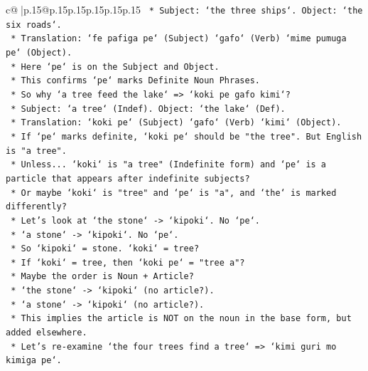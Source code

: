 \documentclass{article}
\begin{document}
{\begin{supertabular}{c@{$\;$}|p{.15\linewidth}@{}p{.15\linewidth}p{.15\linewidth}p{.15\linewidth}p{.15\linewidth}p{.15\linewidth}}
{{{\texttt{                            *   Subject: `the three ships`. Object: `the six roads`.} \\
\texttt{                            *   Translation: `fe pafiga pe` (Subject) `gafo` (Verb) `mime pumuga pe` (Object).} \\
\texttt{                            *   Here `pe` is on the Subject and Object.} \\
\texttt{                            *   This confirms `pe` marks Definite Noun Phrases.} \\
\texttt{                            *   So why `a tree feed the lake` => `koki pe gafo kimi`?} \\
\texttt{                            *   Subject: `a tree` (Indef). Object: `the lake` (Def).} \\
\texttt{                            *   Translation: `koki pe` (Subject) `gafo` (Verb) `kimi` (Object).} \\
\texttt{                            *   If `pe` marks definite, `koki pe` should be "the tree". But English is "a tree".} \\
\texttt{                            *   Unless... `koki` is "a tree" (Indefinite form) and `pe` is a particle that appears after indefinite subjects?} \\
\texttt{                            *   Or maybe `koki` is "tree" and `pe` is "a", and `the` is marked differently?} \\
\texttt{                            *   Let's look at `the stone` {-}> `kipoki`. No `pe`.} \\
\texttt{                            *   `a stone` {-}> `kipoki`. No `pe`.} \\
\texttt{                            *   So `kipoki` = stone. `koki` = tree?} \\
\texttt{                            *   If `koki` = tree, then `koki pe` = "tree a"?} \\
\texttt{                            *   Maybe the order is Noun + Article?} \\
\texttt{                            *   `the stone` {-}> `kipoki` (no article?).} \\
\texttt{                            *   `a stone` {-}> `kipoki` (no article?).} \\
\texttt{                            *   This implies the article is NOT on the noun in the base form, but added elsewhere.} \\
\texttt{                            *   Let's re{-}examine `the four trees find a tree` => `kimi guri mo kimiga pe`.} \\
}}}
\end{supertabular}}
\end{document}
